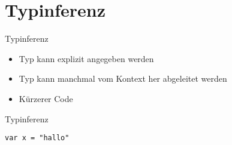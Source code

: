 \section{Typinferenz}

\begin{frame}[t]{Typinferenz}

\begin{itemize}[<+->]
\item Typ kann explizit angegeben werden
\item Typ kann manchmal vom Kontext her abgeleitet werden
\item Kürzerer Code
\end{itemize}

\end{frame}

\begin{frame}[fragile]{Typinferenz}
\begin{lstlisting}
var x = "hallo"
\end{lstlisting}

\end{frame}
